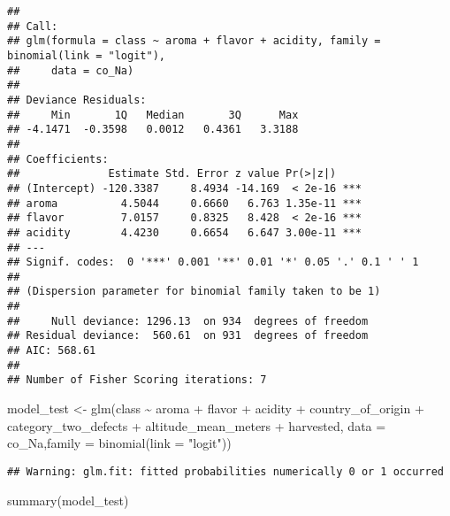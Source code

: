 \documentclass[
]{article}
\newenvironment{Shaded}{\begin{snugshade}}{\end{snugshade}}
\newcommand{\AttributeTok}[1]{\textcolor[rgb]{0.77,0.63,0.00}{#1}}
\newcommand{\FunctionTok}[1]{\textcolor[rgb]{0.00,0.00,0.00}{#1}}
\newcommand{\NormalTok}[1]{#1}
\newcommand{\OtherTok}[1]{\textcolor[rgb]{0.56,0.35,0.01}{#1}}
\newcommand{\SpecialCharTok}[1]{\textcolor[rgb]{0.00,0.00,0.00}{#1}}
\newcommand{\StringTok}[1]{\textcolor[rgb]{0.31,0.60,0.02}{#1}}
\begin{document}
\begin{verbatim}
## 
## Call:
## glm(formula = class ~ aroma + flavor + acidity, family = binomial(link = "logit"), 
##     data = co_Na)
## 
## Deviance Residuals: 
##     Min       1Q   Median       3Q      Max  
## -4.1471  -0.3598   0.0012   0.4361   3.3188  
## 
## Coefficients:
##              Estimate Std. Error z value Pr(>|z|)    
## (Intercept) -120.3387     8.4934 -14.169  < 2e-16 ***
## aroma          4.5044     0.6660   6.763 1.35e-11 ***
## flavor         7.0157     0.8325   8.428  < 2e-16 ***
## acidity        4.4230     0.6654   6.647 3.00e-11 ***
## ---
## Signif. codes:  0 '***' 0.001 '**' 0.01 '*' 0.05 '.' 0.1 ' ' 1
## 
## (Dispersion parameter for binomial family taken to be 1)
## 
##     Null deviance: 1296.13  on 934  degrees of freedom
## Residual deviance:  560.61  on 931  degrees of freedom
## AIC: 568.61
## 
## Number of Fisher Scoring iterations: 7
\end{verbatim}

\begin{Shaded}
\begin{Highlighting}[]
\NormalTok{model\_test }\OtherTok{\textless{}{-}} \FunctionTok{glm}\NormalTok{(class }\SpecialCharTok{\textasciitilde{}}\NormalTok{ aroma }\SpecialCharTok{+}\NormalTok{ flavor }\SpecialCharTok{+}\NormalTok{ acidity }\SpecialCharTok{+}\NormalTok{ country\_of\_origin }\SpecialCharTok{+}\NormalTok{ category\_two\_defects }\SpecialCharTok{+}\NormalTok{ altitude\_mean\_meters }\SpecialCharTok{+}\NormalTok{ harvested, }\AttributeTok{data =}\NormalTok{ co\_Na,}\AttributeTok{family =} \FunctionTok{binomial}\NormalTok{(}\AttributeTok{link =} \StringTok{"logit"}\NormalTok{))}
\end{Highlighting}
\end{Shaded}

\begin{verbatim}
## Warning: glm.fit: fitted probabilities numerically 0 or 1 occurred
\end{verbatim}

\begin{Shaded}
\begin{Highlighting}[]
\FunctionTok{summary}\NormalTok{(model\_test)}
\end{Highlighting}
\end{Shaded}
\end{document}
